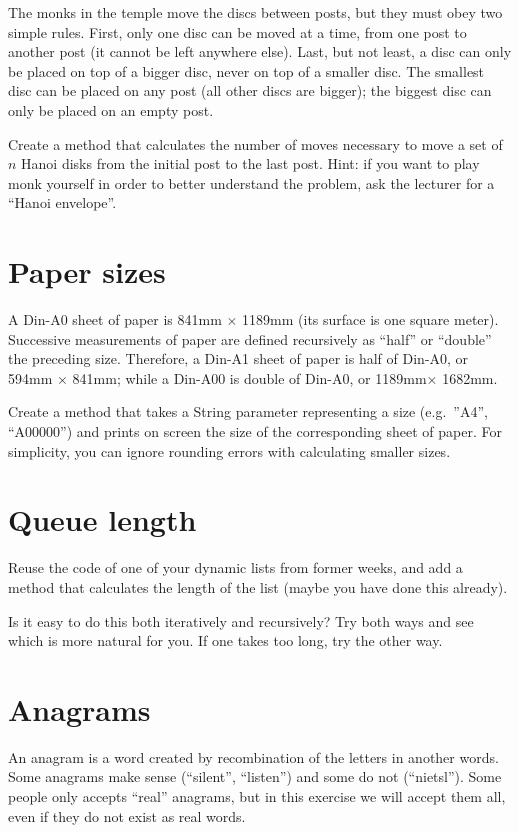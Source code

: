 \documentclass{article}
\begin{document}
The monks in the temple move the discs between posts, but they must
obey two simple rules. First, only one disc can be moved at a time,
from one post to another post (it cannot be left anywhere else). Last,
but not least, a disc can only be placed on top of a bigger disc, never
on top of a smaller disc. The smallest disc can be placed
on any post (all other discs are bigger); the biggest disc can only be
placed on an empty post.

Create a method that calculates the number of moves necessary to move
a set of $n$ Hanoi disks from the initial post to the last post. Hint:
if you want to play monk yourself in order to better understand the
problem, ask the lecturer for a ``Hanoi envelope''. 

\section{Paper sizes}
\label{sec:paper-sizes}

A Din-A0 sheet of paper is 841mm $\times$ 1189mm (its surface is one
square meter). Successive measurements of paper are defined
recursively as ``half'' or ``double'' the preceding size. Therefore,
a Din-A1 sheet of paper is half of Din-A0, or 594mm $\times$ 841mm;
while a Din-A00 is double of Din-A0, or 1189mm$\times$ 1682mm. 

Create a method that takes a String parameter representing a size
(e.g.~''A4'', ``A00000'') and prints on screen the size of the
corresponding sheet of paper. For simplicity, you can ignore rounding
errors with calculating smaller sizes. 

\section{Queue length}
\label{sec:queue-length}

Reuse the code of one of your dynamic lists from former weeks, and add
a method that calculates the length of the list (maybe you have done
this already). 

Is it easy to do this both iteratively and recursively? Try both ways
and see which is more natural for you. If one takes too long, try the
other way. 

\section{Anagrams}
\label{sec:anagrams}

An anagram is a word created by recombination of the letters in
another words. Some anagrams make sense (``silent'', ``listen'') and
some do not (``nietsl''). Some people only accepts ``real'' anagrams,
but in this exercise we will accept them all, even if they do not
exist as real words. 
\end{document}
